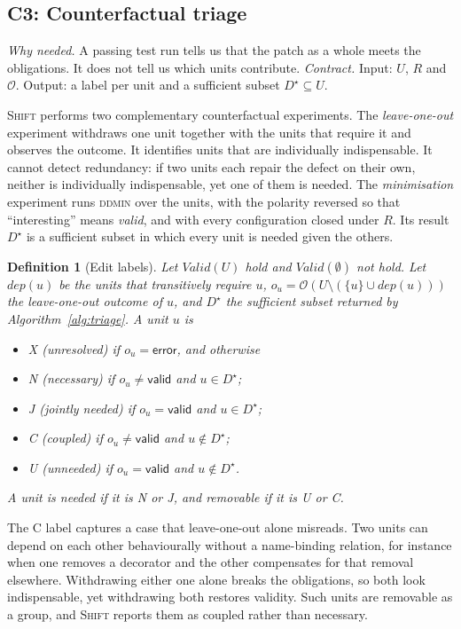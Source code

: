 \documentclass[a4paper,fleqn]{cas-sc}
\newcommand{\tool}{\textsc{Shift}}
\newcommand{\lab}[1]{\textsf{#1}}
\newtheorem{definition}{Definition}
\begin{document}
\subsection{C3: Counterfactual triage}\label{sec:triage}
\emph{Why needed.} A passing test run tells us that the patch as a whole meets the obligations. It does not tell us which units contribute. \emph{Contract.} Input: $U$, $R$ and $\mathcal{O}$. Output: a label per unit and a sufficient subset $D^\star\subseteq U$.

\tool{} performs two complementary counterfactual experiments. The \emph{leave-one-out} experiment withdraws one unit together with the units that require it and observes the outcome. It identifies units that are individually indispensable. It cannot detect redundancy: if two units each repair the defect on their own, neither is individually indispensable, yet one of them is needed. The \emph{minimisation} experiment runs \textsc{ddmin} over the units, with the polarity reversed so that ``interesting'' means \emph{valid}, and with every configuration closed under $R$. Its result $D^\star$ is a sufficient subset in which every unit is needed given the others.

\begin{definition}[Edit labels]\label{def:labels}
Let $\mathit{Valid}(U)$ hold and $\mathit{Valid}(\emptyset)$ not hold. Let $\mathit{dep}(u)$ be the units that transitively require $u$, $o_u=\mathcal{O}(U\setminus(\{u\}\cup\mathit{dep}(u)))$ the leave-one-out outcome of $u$, and $D^\star$ the sufficient subset returned by Algorithm~\ref{alg:triage}. A unit $u$ is
\begin{itemize}
\item \lab{X} (\emph{unresolved}) if $o_u=\lab{error}$, and otherwise
\item \lab{N} (\emph{necessary}) if $o_u\neq\lab{valid}$ and $u\in D^\star$;
\item \lab{J} (\emph{jointly needed}) if $o_u=\lab{valid}$ and $u\in D^\star$;
\item \lab{C} (\emph{coupled}) if $o_u\neq\lab{valid}$ and $u\notin D^\star$;
\item \lab{U} (\emph{unneeded}) if $o_u=\lab{valid}$ and $u\notin D^\star$.
\end{itemize}
A unit is \emph{needed} if it is \lab{N} or \lab{J}, and \emph{removable} if it is \lab{U} or \lab{C}.
\end{definition}

The \lab{C} label captures a case that leave-one-out alone misreads. Two units can depend on each other behaviourally without a name-binding relation, for instance when one removes a decorator and the other compensates for that removal elsewhere. Withdrawing either one alone breaks the obligations, so both look indispensable, yet withdrawing both restores validity. Such units are removable as a group, and \tool{} reports them as coupled rather than necessary.
\end{document}
